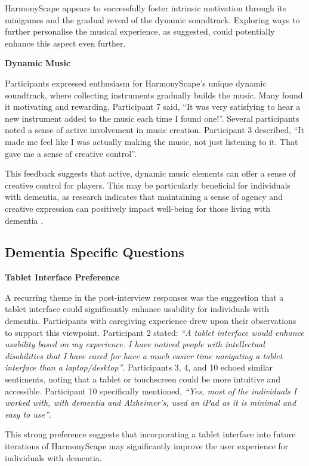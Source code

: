 \documentclass{l4proj}
\begin{document}
HarmonyScape appears to successfully foster intrinsic motivation through its minigames and the gradual reveal of the dynamic soundtrack. Exploring ways to further personalise the musical experience, as suggested, could potentially enhance this aspect even further.
\newline

\textbf{Dynamic Music}

Participants expressed enthusiasm for HarmonyScape's unique dynamic soundtrack, where collecting instruments gradually builds the music. Many found it motivating and rewarding. Participant 7 said, “It was very satisfying to hear a new instrument added to the music each time I found one!”. Several participants noted a sense of active involvement in music creation. Participant 3 described, “It made me feel like I was actually making the music, not just listening to it. That gave me a sense of creative control”.

This feedback suggests that active, dynamic music elements can offer a sense of creative control for players. This may be particularly beneficial for individuals with dementia, as research indicates that maintaining a sense of agency and creative expression can positively impact well-being for those living with dementia \citep{sanchez_comparing_2016}.




\subsection{Dementia Specific Questions}

\textbf{Tablet Interface Preference}

A recurring theme in the post-interview responses was the suggestion that a tablet interface could significantly enhance usability for individuals with dementia. Participants with caregiving experience drew upon their observations to support this viewpoint. Participant 2 stated: \emph{“A tablet interface would enhance usability based on my experience. I have noticed people with intellectual disabilities that I have cared for have a much easier time navigating a tablet interface than a laptop/desktop”}. Participants 3, 4, and 10 echoed similar sentiments, noting that a tablet or touchscreen could be more intuitive and accessible. Participant 10 specifically mentioned, \emph{“Yes, most of the individuals I worked with, with dementia and Alzheimer's, used an iPad as it is minimal and easy to use”}. 

This strong preference suggests that incorporating a tablet interface into future iterations of HarmonyScape may significantly improve the user experience for individuals with dementia.
\newline
\end{document}
